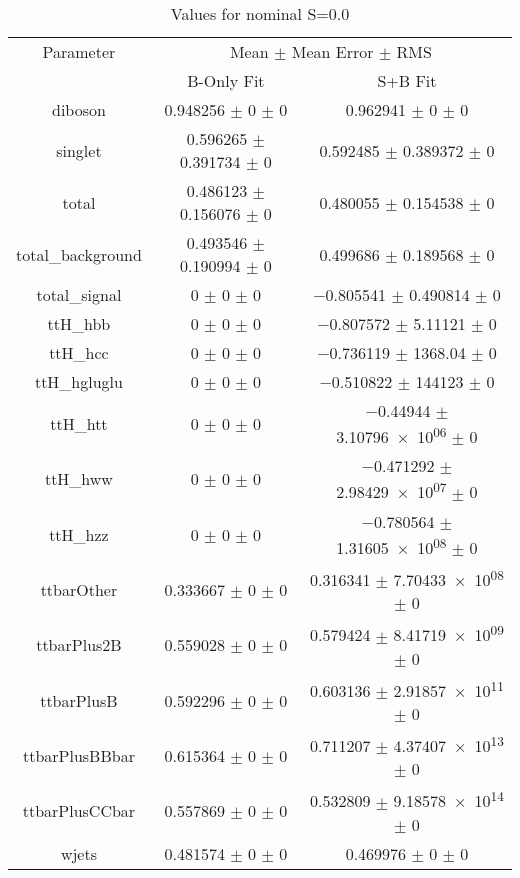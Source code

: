 \begin{table}
\centering
\caption{Values for nominal S=0.0}
\begin{tabular}{ccc}
\toprule
Parameter & \multicolumn{2}{c}{Mean $\pm$ Mean Error $\pm$ RMS}\\
 & B-Only Fit & S+B Fit\\
\midrule
diboson & \num{0.948256} $\pm$ \num{0} $\pm$ \num{0} & \num{0.962941} $\pm$ \num{0} $\pm$ \num{0}\\
singlet & \num{0.596265} $\pm$ \num{0.391734} $\pm$ \num{0} & \num{0.592485} $\pm$ \num{0.389372} $\pm$ \num{0}\\
total & \num{0.486123} $\pm$ \num{0.156076} $\pm$ \num{0} & \num{0.480055} $\pm$ \num{0.154538} $\pm$ \num{0}\\
total\_background & \num{0.493546} $\pm$ \num{0.190994} $\pm$ \num{0} & \num{0.499686} $\pm$ \num{0.189568} $\pm$ \num{0}\\
total\_signal & \num{0} $\pm$ \num{0} $\pm$ \num{0} & \num{-0.805541} $\pm$ \num{0.490814} $\pm$ \num{0}\\
ttH\_hbb & \num{0} $\pm$ \num{0} $\pm$ \num{0} & \num{-0.807572} $\pm$ \num{5.11121} $\pm$ \num{0}\\
ttH\_hcc & \num{0} $\pm$ \num{0} $\pm$ \num{0} & \num{-0.736119} $\pm$ \num{1368.04} $\pm$ \num{0}\\
ttH\_hgluglu & \num{0} $\pm$ \num{0} $\pm$ \num{0} & \num{-0.510822} $\pm$ \num{144123} $\pm$ \num{0}\\
ttH\_htt & \num{0} $\pm$ \num{0} $\pm$ \num{0} & \num{-0.44944} $\pm$ \num{3.10796e+06} $\pm$ \num{0}\\
ttH\_hww & \num{0} $\pm$ \num{0} $\pm$ \num{0} & \num{-0.471292} $\pm$ \num{2.98429e+07} $\pm$ \num{0}\\
ttH\_hzz & \num{0} $\pm$ \num{0} $\pm$ \num{0} & \num{-0.780564} $\pm$ \num{1.31605e+08} $\pm$ \num{0}\\
ttbarOther & \num{0.333667} $\pm$ \num{0} $\pm$ \num{0} & \num{0.316341} $\pm$ \num{7.70433e+08} $\pm$ \num{0}\\
ttbarPlus2B & \num{0.559028} $\pm$ \num{0} $\pm$ \num{0} & \num{0.579424} $\pm$ \num{8.41719e+09} $\pm$ \num{0}\\
ttbarPlusB & \num{0.592296} $\pm$ \num{0} $\pm$ \num{0} & \num{0.603136} $\pm$ \num{2.91857e+11} $\pm$ \num{0}\\
ttbarPlusBBbar & \num{0.615364} $\pm$ \num{0} $\pm$ \num{0} & \num{0.711207} $\pm$ \num{4.37407e+13} $\pm$ \num{0}\\
ttbarPlusCCbar & \num{0.557869} $\pm$ \num{0} $\pm$ \num{0} & \num{0.532809} $\pm$ \num{9.18578e+14} $\pm$ \num{0}\\
wjets & \num{0.481574} $\pm$ \num{0} $\pm$ \num{0} & \num{0.469976} $\pm$ \num{0} $\pm$ \num{0}\\
\bottomrule
\end{tabular}
\end{table}